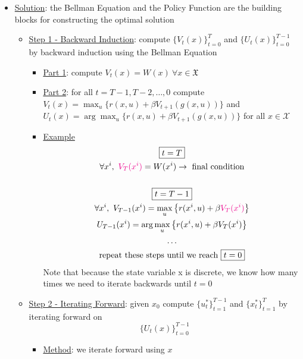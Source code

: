 \documentclass{article}
\begin{document}
\begin{itemize}
\begin{itemize}
    \end{itemize}
    \item  \underline{Solution}: the Bellman Equation and the Policy Function are the building blocks for constructing the optimal solution
    \begin{itemize}
        \item  \underline{Step 1 - Backward Induction}: compute $\{ V_{t} (x) \}_{t=0}^{T}$ and $\{ U_{t} (x) \}_{t=0}^{T−1}$ by backward induction using the Bellman Equation
        \begin{itemize}
            \item \underline{Part 1}: compute $V_{t}(x) = W(x) \ \forall x \in \mathfrak{X}$
            \item  \underline{Part 2}: for all $t = T − 1, T −2, \dots, 0$ compute $V_{t}(x) = \max_{u} \{ r(x,u) + \beta V_{t+1} (g(x, u)) \}$ and $U_{t}(x) = \arg \max_{u} \{ r(x,u) + \beta V_{t+1} (g(x, u)) \}$ for all $x \in \mathcal{X}$
            \item \underline{Example}
            \begin{gather*}
                \boxed{t=T} \\
                \forall x^{i}, \ \begingroup\color{magenta} V_{T}(x^{i}) \endgroup = W(x^{i}) \rightarrow \ \text{final condition} \\
                \\
                \boxed{t=T-1} \\
                \forall x^{i}, \ V_{T-1}(x^{i}) = \max_{u} \left\{ r(x^{i}, u) + \beta \begingroup\color{magenta} V_{T}(x^{i}) \endgroup \right\} \\
                U_{T-1}(x^{i}) = \arg \max_{u} \left\{ r(x^{i}, u) + \beta V_{T}(x^{i}) \right\} \\
                \dots \\
                \text{repeat these steps until we reach} \ \boxed{t=0}
            \end{gather*}
            Note that because the state variable x is discrete, we know how many times we need to iterate backwards until $t=0$
        \end{itemize}
        \item  \underline{Step 2 - Iterating Forward}: given $x_{0}$ compute $\{u_{t}^{*}\}_{t=1}^{T−1}$ and $\{x_{t}^{*}\}_{t=1}^{T}$ by iterating forward on $$\{ U_{t} (x) \}_{t=0}^{T−1}$$
        \begin{itemize}
            \item \underline{Method}: we iterate forward using $x$

\end{itemize}
\end{itemize}
\end{itemize}
\end{document}
